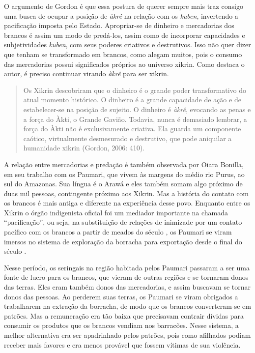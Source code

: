 {O argumento de Gordon é que essa postura de querer sempre mais traz
consigo uma busca de ocupar a posição de \emph{àkrê} na relação com os \emph{kuben},
invertendo a pacificação imposta pelo Estado. Apropriar-se de dinheiro
e mercadorias dos brancos é assim um modo de predá-los, assim como de
incorporar capacidades e subjetividades \emph{kuben}, com seus poderes
criativos e destrutivos. Isso não quer dizer que tenham se transformado
em brancos, como alegam muitos, pois o consumo das mercadorias possui
significados próprios ao universo xikrin. Como destaca o autor, é
preciso continuar virando \emph{àkrê} para ser xikrin.

\begin{quote}
Os Xikrin descobriram que o dinheiro é o grande poder transformativo do
atual momento histórico. O dinheiro é a grande capacidade de ação e de
estabelecer-se na posição de sujeito. O dinheiro é \emph{àkrê}, evocando as
penas e a força do Àkti, o Grande Gavião. Todavia, nunca é demasiado
lembrar, a força do Àkti não é exclusivamente criativa. Ela guarda um
componente caótico, virtualmente desmesurado e destrutivo, que pode
aniquilar a humanidade xikrin (Gordon, 2006: 410).
\end{quote}

A relação entre mercadorias e predação é também observada por Oiara
Bonilla, em seu trabalho com os Paumari, que vivem às margens do médio
rio Purus, ao sul do Amazonas. Sua língua é o Arawá e eles também somam
algo próximo de duas mil pessoas, contingente próximo aos Xikrin. Mas a
história do contato com os brancos é mais antiga e diferente na
experiência desse povo. Enquanto entre os Xikrin o órgão indigenista
oficial foi um mediador importante na chamada ``pacificação'', ou seja,
na substituição de relações de inimizade por um contato pacífico com os
brancos a partir de meados do século , os Paumari se viram imersos no
sistema de exploração da borracha para exportação desde o final do
século .

Nesse período, os seringais na região habitada pelos Paumari passaram a
ser uma fonte de lucro para os brancos, que vieram de outras regiões e
se tornaram donos das terras. Eles eram também donos das mercadorias, e
assim buscavam se tornar donos das pessoas. Ao perderem suas terras, os
Paumari se viram obrigados a trabalharem na extração da borracha, de
modo que os brancos converteram-se em patrões. Mas a remuneração era
tão baixa que precisavam contrair dívidas para consumir os produtos que
os brancos vendiam nos barracões. Nesse sistema, a melhor alternativa
era ser apadrinhado pelos patrões, pois como afilhados podiam receber
mais favores e era menos provável que fossem vítimas de sua violência.

}
